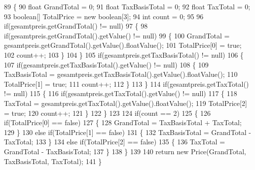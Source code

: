 \begin{DoxyCode}
89     \{
90         \textcolor{keywordtype}{float} GrandTotal = 0;
91         \textcolor{keywordtype}{float} TaxBasisTotal = 0;
92         \textcolor{keywordtype}{float} TaxTotal = 0;
93         \textcolor{keywordtype}{boolean}[] TotalPrice = \textcolor{keyword}{new} \textcolor{keywordtype}{boolean}[3];
94         \textcolor{keywordtype}{int} count = 0;
95         
96         \textcolor{keywordflow}{if}(gesamtpreis.getGrandTotal() != null)
97         \{
98             \textcolor{keywordflow}{if}(gesamtpreis.getGrandTotal().getValue() != null)
99             \{
100                 GrandTotal = gesamtpreis.getGrandTotal().getValue().floatValue();
101                 TotalPrice[0] = \textcolor{keyword}{true};
102                 count++;
103             \}
104         \}
105         \textcolor{keywordflow}{if}(gesamtpreis.getTaxBasisTotal() != null)
106         \{
107             \textcolor{keywordflow}{if}(gesamtpreis.getTaxBasisTotal().getValue() != null)
108             \{
109                 TaxBasisTotal = gesamtpreis.getTaxBasisTotal().getValue().floatValue();
110                 TotalPrice[1] = \textcolor{keyword}{true};
111                 count++;
112             \}
113         \}
114         \textcolor{keywordflow}{if}(gesamtpreis.getTaxTotal() != null)
115         \{
116             \textcolor{keywordflow}{if}(gesamtpreis.getTaxTotal().getValue() != null)
117             \{
118                 TaxTotal = gesamtpreis.getTaxTotal().getValue().floatValue();
119                 TotalPrice[2] = \textcolor{keyword}{true};
120                 count++;
121             \}
122         \}
123         
124         \textcolor{keywordflow}{if}(count == 2)
125         \{
126             \textcolor{keywordflow}{if}(TotalPrice[0] == \textcolor{keyword}{false})
127             \{
128                 GrandTotal = TaxBasisTotal + TaxTotal;              
129             \}
130             \textcolor{keywordflow}{else} \textcolor{keywordflow}{if}(TotalPrice[1] == \textcolor{keyword}{false})
131             \{
132                 TaxBasisTotal = GrandTotal - TaxTotal;
133             \}
134             \textcolor{keywordflow}{else} \textcolor{keywordflow}{if}(TotalPrice[2] == \textcolor{keyword}{false})
135             \{
136                 TaxTotal = GrandTotal - TaxBasisTotal;
137             \}
138         \}
139         
140         \textcolor{keywordflow}{return} \textcolor{keyword}{new} Price(GrandTotal, TaxBasisTotal, TaxTotal);
141     \}
\end{DoxyCode}
